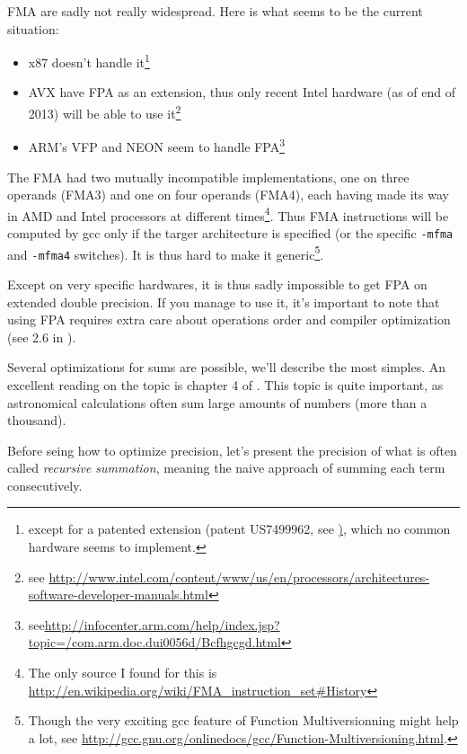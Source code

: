 FMA are sadly not really widespread. Here is what seems to be the current situation:
\begin{itemize}
\item x87 doesn't handle it\footnote{except for a patented extension (patent US7499962, see \href{http://www.google.com/patents/US7499962}), which no common hardware seems to implement.}
\item AVX have FPA as an extension, thus only recent Intel hardware (as of end of 2013) will be able to use it\footnote{see \url{http://www.intel.com/content/www/us/en/processors/architectures-software-developer-manuals.html}\TODO}
\item ARM's VFP and NEON seem to handle FPA\footnote{see\url{http://infocenter.arm.com/help/index.jsp?topic=/com.arm.doc.dui0056d/Bcfhgcgd.html}}
\end{itemize}

The FMA had two mutually incompatible implementations, one on three operands (FMA3) and one on four operands (FMA4), each having made its way in AMD and Intel processors at different times\footnote{The only source I found for this is \url{http://en.wikipedia.org/wiki/FMA\_instruction\_set\#History}}. Thus FMA instructions will be computed by gcc only if the targer architecture is specified (or the specific \texttt{-mfma} and \texttt{-mfma4} switches). It is thus hard to make it generic\footnote{Though the very exciting gcc feature of Function Multiversionning might help a lot, see \url{http://gcc.gnu.org/onlinedocs/gcc/Function-Multiversioning.html}.}.

Except on very specific hardwares, it is thus sadly impossible to get FPA on extended double precision. If you manage to use it, it's important to note that using FPA requires extra care about operations order and compiler optimization (see 2.6 in \cite{Higham}).

\label{summations}

Several optimizations for sums are possible, we'll describe the most simples. An excellent reading on the topic is chapter 4 of \cite{Higham}. This topic is quite important, as astronomical calculations often sum large amounts of numbers (more than a thousand).


Before seing how to optimize precision, let's present the precision of what is often called \emph{recursive summation}, meaning the naive approach of summing each term consecutively.

